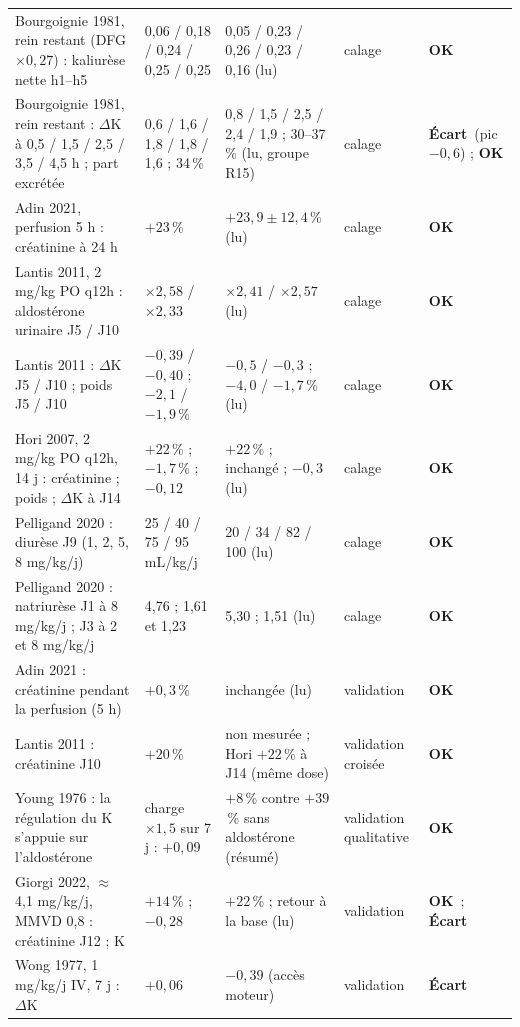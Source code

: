 \documentclass[10pt,a4paper]{article}
\newcommand{\ok}{\textcolor{green!45!black}{\textbf{OK}}}
\newcommand{\ecart}{\textcolor{red!70!black}{\textbf{Écart}}}
\begin{document}
\begin{table}[h]
\begin{tabularx}{\linewidth}{P{4.6cm}P{2.4cm}P{3.3cm}LP{1.3cm}}
Bourgoignie 1981, rein restant (DFG $\times 0{,}27$) : kaliurèse nette h1–h5 & 0,06 / 0,18 / 0,24 / 0,25 / 0,25 & 0,05 / 0,23 / 0,26 / 0,23 / 0,16 (lu) & calage & \ok\\
Bourgoignie 1981, rein restant : $\Delta$K à 0,5 / 1,5 / 2,5 / 3,5 / 4,5 h ; part excrétée & 0,6 / 1,6 / 1,8 / 1,8 / 1,6 ; 34\,\% & 0,8 / 1,5 / 2,5 / 2,4 / 1,9 ; 30–37\,\% (lu, groupe R15) & calage & \ecart\ (pic $-0{,}6$) ; \ok\\
Adin 2021, perfusion 5 h : créatinine à 24 h & $+23$\,\% & $+23{,}9 \pm 12{,}4$\,\% (lu) & calage & \ok\\
Lantis 2011, 2 mg/kg PO q12h : aldostérone urinaire J5 / J10 & $\times 2{,}58$ / $\times 2{,}33$ & $\times 2{,}41$ / $\times 2{,}57$ (lu) & calage & \ok\\
Lantis 2011 : $\Delta$K J5 / J10 ; poids J5 / J10 & $-0{,}39$ / $-0{,}40$ ; $-2{,}1$ / $-1{,}9$\,\% & $-0{,}5$ / $-0{,}3$ ; $-4{,}0$ / $-1{,}7$\,\% (lu) & calage & \ok\\
Hori 2007, 2 mg/kg PO q12h, 14 j : créatinine ; poids ; $\Delta$K à J14 & $+22$\,\% ; $-1{,}7$\,\% ; $-0{,}12$ & $+22$\,\% ; inchangé ; $-0{,}3$ (lu) & calage & \ok\\
Pelligand 2020 : diurèse J9 (1, 2, 5, 8 mg/kg/j) & 25 / 40 / 75 / 95 mL/kg/j & 20 / 34 / 82 / 100 (lu) & calage & \ok\\
Pelligand 2020 : natriurèse J1 à 8 mg/kg/j ; J3 à 2 et 8 mg/kg/j & 4,76 ; 1,61 et 1,23 & 5,30 ; 1,51 (lu) & calage & \ok\\
\midrule
Adin 2021 : créatinine pendant la perfusion (5 h) & $+0{,}3$\,\% & inchangée (lu) & validation & \ok\\
Lantis 2011 : créatinine J10 & $+20$\,\% & non mesurée ; Hori $+22$\,\% à J14 (même dose) & validation croisée & \ok\\
Young 1976 : la régulation du K s'appuie sur l'aldostérone & charge $\times 1{,}5$ sur 7 j : $+0{,}09$ & $+8$\,\% contre $+39$\,\% sans aldostérone (résumé) & validation qualitative & \ok\\
Giorgi 2022, $\approx$ 4,1 mg/kg/j, MMVD 0,8 : créatinine J12 ; K & $+14$\,\% ; $-0{,}28$ & $+22$\,\% ; retour à la base (lu) & validation & \ok\ ; \ecart\\
Wong 1977, 1 mg/kg/j IV, 7 j : $\Delta$K & $+0{,}06$ & $-0{,}39$ (accès moteur) & validation & \ecart\\
\bottomrule
\end{tabularx}
\end{table}
\end{document}

